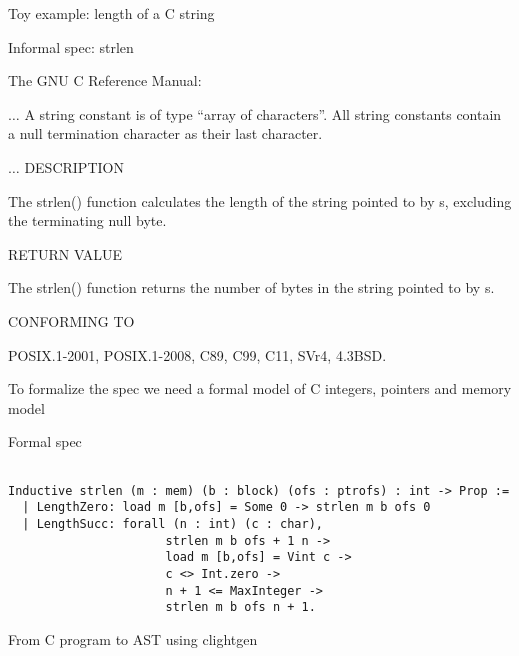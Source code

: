 \documentclass{beamer}
\begin{document}
  \begin{frame} {\huge \center Toy example: length of a C string} \end{frame}


\begin{frame}{Informal spec: strlen}


  The GNU C Reference Manual:
 \bigskip


  $\ldots$ A string constant is of type ``array of characters''. All string constants contain a null termination character as their last character.

\bigskip

$\ldots$
DESCRIPTION        

 The strlen() function calculates the length of the string pointed to
 by s, excluding the terminating null byte.

 \bigskip

RETURN VALUE 

 The strlen() function returns the number of bytes in the string
 pointed to by s.

 \bigskip

CONFORMING TO 

 POSIX.1-2001, POSIX.1-2008, C89, C99, C11, SVr4, 4.3BSD.



\end{frame}

\begin{frame}
 To formalize the spec we need a formal model of C integers, pointers and memory model
\end{frame}

\begin{frame}[t,fragile]{Formal spec}

  \begin{lstlisting}[language=Coq]
    
Inductive strlen (m : mem) (b : block) (ofs : ptrofs) : int -> Prop :=
  | LengthZero: load m [b,ofs] = Some 0 -> strlen m b ofs 0
  | LengthSucc: forall (n : int) (c : char),
                      strlen m b ofs + 1 n ->
                      load m [b,ofs] = Vint c ->
                      c <> Int.zero ->
                      n + 1 <= MaxInteger ->
                      strlen m b ofs n + 1.
  \end{lstlisting}
  
  
  
      
\end{frame}

\begin{frame}{From C program to AST using clightgen}



\end{frame}
\end{document}
